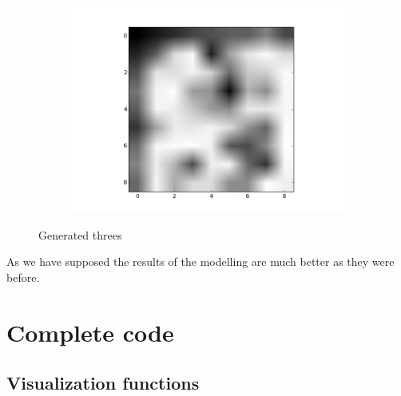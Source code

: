 \documentclass{article}
\begin{document}
\begin{figure}[ht]
\begin{subfigure}[b]{0.5\textwidth}
                \includegraphics[width=\textwidth]{../combined_3.png}
        \end{subfigure}        
        \caption{Generated threes}
\end{figure}

\FloatBarrier

As we have supposed the results of the modelling are much better as they were before.



\section{Complete code}
\subsection{Visualization functions}
\end{document}
